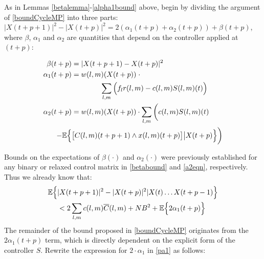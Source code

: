 \begin{IEEEproof}
As in Lemmas \ref{betalemma}-\ref{alpha1bound} above, begin by dividing the argument of \eqref{boundCycleMP} into three parts: $|X(t+ p + 1)|^{2} - |X(t + p)|^{2}  = 2(\alpha_1(t + p)+\alpha_2(t + p)) + \beta(t + p)$, 
where $\beta$, $\alpha_{1}$ and $\alpha_{2}$ are quantities that depend on the controller applied at $(t + p)$:
\begin{small}
\begin{align}
\beta (t+p)  &= \vert X(t + p + 1) - X(t + p) \vert^{2} \label{pbeta} \\
\alpha_{1} (t+p) &= w(l,m)(X(t + p)) \; \cdot \label{pa1} \\  \nonumber
& \qquad \qquad  \sum_{l,m} \Big(f_{l}r(l,m) - c(l,m)S(l,m)(t)\Big)\\ 
 \alpha_{2}  (t+p)&= w(l,m)(X(t + p)) \cdot \sum_{l,m} \bigg(c(l,m)S(l,m)(t) \label{pa2} \\ \nonumber
 - \expectation{ & \big[C(l,m)(t+p + 1)\wedge x(l,m)(t + p)\big] \big| X(t + p) }\bigg)
 \end{align}
 \end{small}Bounds on the expectations of  $\beta(\cdot)$ and $\alpha_2(\cdot)$ were previously established for any binary or relaxed control matrix in \eqref{betabound} and \eqref{a2eqn}, respectively. Thus we already know that:
\begin{align}\nonumber
\expectation{&\vert X(t + p + 1) \vert^2 - \vert X(t + p)\vert^2 \vert X(t) \ldots X(t + p - 1)} \\  \label{cbmpcombined1}
&< 2 \sum_{l,m} c(l,m)\overline{C}(l,m) + N B^2 + \expectation{2\alpha_1(t+p) }
\end{align}
The remainder of the bound proposed in \eqref{boundCycleMP} originates from the $2 \alpha_1 (t+p)$ term, which is directly dependent on the explicit form of the controller $S$. Rewrite the expression for $2\cdot \alpha_1$ in \eqref{pa1} as follows:

\end{IEEEproof}
